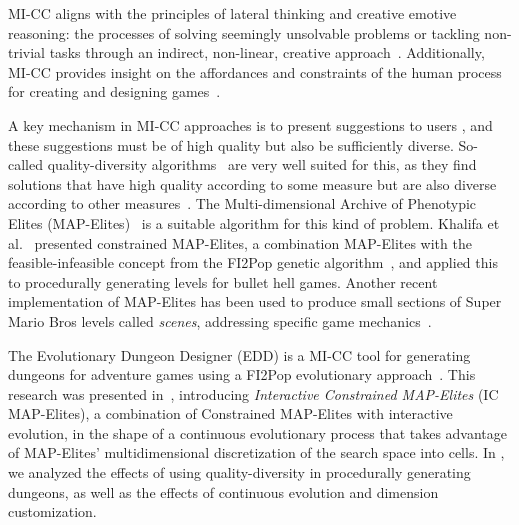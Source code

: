 MI-CC aligns with the principles of lateral thinking and creative emotive reasoning: the processes of solving seemingly unsolvable problems or tackling non-trivial tasks through an indirect, non-linear, creative approach~. Additionally, MI-CC provides insight on the affordances and constraints of the human process for creating and designing games~.

A key mechanism in MI-CC approaches is to present suggestions to users%
, and these suggestions must be of high quality but also be sufficiently diverse. So-called quality-diversity algorithms~ are very well suited for this, as they find solutions that have high quality according to some measure but are also diverse according to other measures~. The Multi-dimensional Archive of Phenotypic Elites (MAP-Elites)~ is a suitable algorithm for this kind of problem. Khalifa et al.~ presented constrained MAP-Elites, a combination MAP-Elites with the feasible-infeasible concept from the FI2Pop genetic algorithm~, and applied this to procedurally generating levels for bullet hell games. %
Another recent implementation of MAP-Elites has been used to produce small sections of Super Mario Bros levels called \textit{scenes}, addressing specific game mechanics~.

The Evolutionary Dungeon Designer (EDD) is a MI-CC tool for generating dungeons for adventure games using a FI2Pop evolutionary approach~. This %
research was presented in~, %
introducing \emph{Interactive Constrained MAP-Elites} (IC MAP-Elites), a combination of Constrained MAP-Elites with interactive evolution, in the shape of %
a continuous evolutionary process that takes advantage of MAP-Elites' multidimensional discretization of the search space into cells. %
In , we analyzed the effects of using quality-diversity in procedurally generating dungeons, as well as the effects of continuous evolution and dimension customization.%


